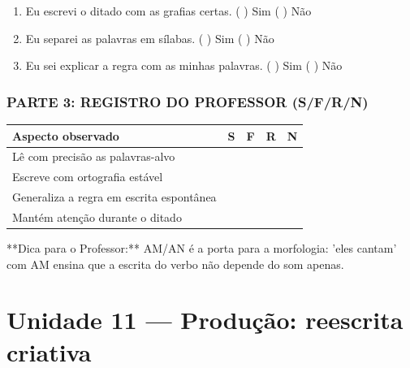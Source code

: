 \begin{exercicio}
\begin{enumerate}[label=\alph*)]
  \item Eu escrevi o ditado com as grafias certas.  \quad ( ) Sim   ( ) Não

  \item Eu separei as palavras em sílabas.  \quad ( ) Sim   ( ) Não

  \item Eu sei explicar a regra com as minhas palavras.  \quad ( ) Sim   ( ) Não

\end{enumerate}

\subsection*{PARTE 3: REGISTRO DO PROFESSOR (S/F/R/N)}

\begin{center}
\renewcommand{\arraystretch}{1.4}
\begin{tabular}{@{}p{9cm}cccc@{}}
\toprule
Aspecto observado & S & F & R & N \\
\midrule
Lê com precisão as palavras-alvo & & & & \\
Escreve com ortografia estável & & & & \\
Generaliza a regra em escrita espontânea & & & & \\
Mantém atenção durante o ditado & & & & \\
\bottomrule\end{tabular}\end{center}

\end{exercicio}

\begin{dica}
**Dica para o Professor:** AM/AN é a porta para a morfologia: 'eles cantam' com AM ensina que a escrita do verbo não depende do som apenas.
\end{dica}


\chapter{Unidade 11 --- Produção: reescrita criativa}


